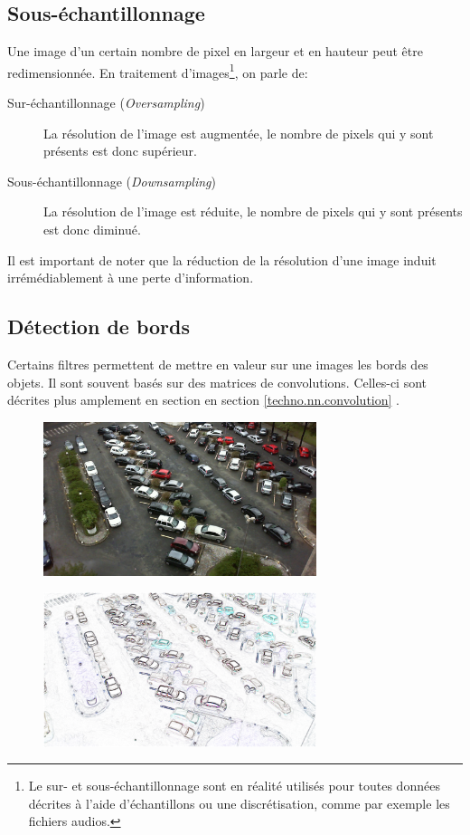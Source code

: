 \subsection{Sous-échantillonnage}
Une image d'un certain nombre de pixel en largeur et en hauteur peut être redimensionnée. En traitement d'images\footnote{Le sur- et sous-échantillonnage sont en réalité utilisés pour toutes données décrites à l'aide d'échantillons ou une discrétisation, comme par exemple les fichiers audios.}, on parle de:
\begin{description}
    \item[Sur-échantillonnage (\textit{Oversampling})] La résolution de l'image est augmentée, le nombre de pixels qui y sont présents est donc supérieur. 
    \item[Sous-échantillonnage (\textit{Downsampling})] La résolution de l'image est réduite, le nombre de pixels qui y sont présents est donc diminué. 
\end{description}

Il est important de noter que la réduction de la résolution d'une image induit irrémédiablement à une perte d'information. 


\subsection{Détection de bords}\label{techno.traitement.bord}
Certains filtres permettent de mettre en valeur sur une images les bords des objets. Il sont souvent basés sur des matrices de convolutions. Celles-ci sont décrites plus amplement en section en section \ref{techno.nn.convolution} . 

\begin{figure}[ht]
    \includegraphics[width=80mm]{img/conception/pklot_park.jpg}
    \centering
\end{figure}

\begin{figure}[ht]
    \includegraphics[width=80mm]{img/conception/image_process/downsample-edge/4.png}
    \centering
\end{figure}

